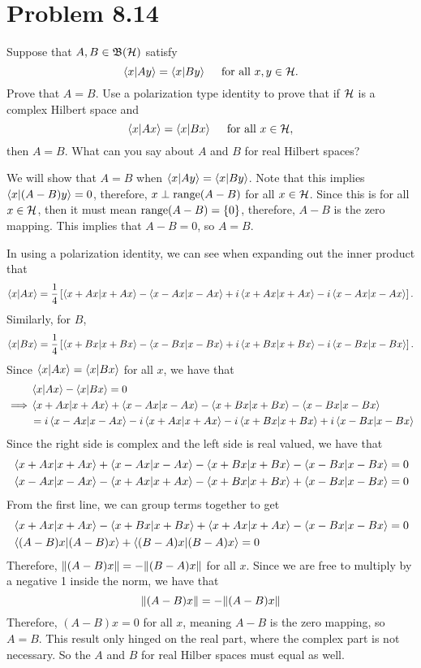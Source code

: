 \newpage
\section{Problem 8.14}
Suppose that $A, B \in \mathfrak{B} (\mathcal{H})$ satisfy
\[\braket{x}{Ay} = \braket{x}{By} \quad \text{ for all } x, y \in \mathcal{H}.\]
Prove that $A = B$. Use a polarization type identity to prove that if $\mathcal{H}$ is a complex Hilbert space and 
\[\braket{x}{Ax} = \braket{x}{Bx} \quad \text{ for all } x\in \mathcal{H},\]
then $A = B$. What can you say about $A$ and $B$ for real Hilbert spaces?
\partbreak
\begin{solution}

    We will show that $A = B$ when $\braket{x}{Ay} = \braket{x}{By}$. Note that this implies $\braket{x}{(A - B)y} = 0$, therefore, $x \perp \text{range}(A - B)$ for all $x \in \mathcal{H}$. Since this is for all $x \in \mathcal{H}$, then it must mean $\text{range}(A - B) = \{0\}$, therefore, $A - B$ is the zero mapping. This implies that $A - B = 0$, so $A = B$. \par

    \hop
    In using a polarization identity, we can see when expanding out the inner product that 
    \[\braket{x}{Ax} = \frac{1}{4}\left[ \braket{x+Ax} - \braket{x - Ax} + i\braket{x + Ax} - i\braket{x - Ax}\right].\]
    Similarly, for $B$, 
    \[\braket{x}{Bx} = \frac{1}{4}\left[ \braket{x+Bx} - \braket{x - Bx} + i\braket{x + Bx} - i\braket{x - Bx}\right].\]
    Since $\braket{x}{Ax} = \braket{x}{Bx}$ for all $x$, we have that
    \begin{align*}
        &\braket{x}{Ax} - \braket{x}{Bx} = 0\\
        \implies & \braket{x + Ax} + \braket{x - Ax} - \braket{x + Bx} - \braket{x - Bx}\\
        & = i\braket{x - Ax} - i\braket{x + Ax} - i\braket{x + Bx} + i\braket{x - Bx}
    \end{align*}
    Since the right side is complex and the left side is real valued, we have that 
    \begin{align*}
        &\braket{x + Ax} + \braket{x - Ax} - \braket{x + Bx} - \braket{x - Bx} = 0\\
        &\braket{x - Ax} - \braket{x + Ax} - \braket{x + Bx} + \braket{x - Bx} = 0
    \end{align*}
    From the first line, we can group terms together to get
    \begin{align*}
        &\braket{x + Ax} - \braket{x + Bx} + \braket{x + Ax} - \braket{x - Bx} = 0\\
        &\braket{(A - B)x} + \braket{(B - A)x} = 0
    \end{align*}
    Therefore, $\norm{(A - B)x} = -\norm{(B - A)x}$ for all $x$. Since we are free to multiply by a negative 1 inside the norm, we have that 
    \[\norm{(A - B)x} = -\norm{(A - B)x}\]
    Therefore, $(A - B)x = 0$ for all $x$, meaning $A - B$ is the zero mapping, so $A = B$. This result only hinged on the real part, where the complex part is not necessary. So the $A$ and $B$ for real Hilber spaces must equal as well. 
\end{solution}

